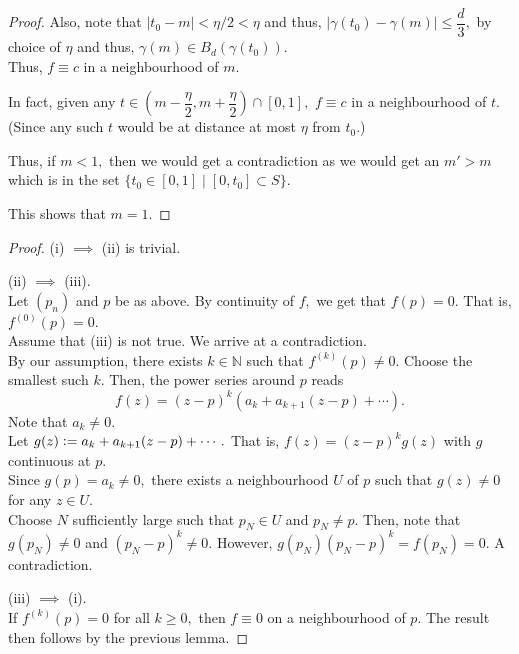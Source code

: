 \begin{proof}
	Also, note that $|t_0 - m| < \eta/2 < \eta$ and thus, $\left|\gamma(t_0) - \gamma(m)\right| \le \dfrac{d}{3},$ by choice of $\eta$ and thus, $\gamma(m) \in B_d(\gamma(t_0)).$\\
	Thus, $f\equiv c$ in a neighbourhood of $m.$

	In fact, given any $t \in \left(m - \dfrac{\eta}{2},  m + \dfrac{\eta}{2}\right) \cap [0, 1],$ $f \equiv c$ in a neighbourhood of $t.$ (Since any such $t$ would be at distance at most $\eta$ from $t_0$.)

	Thus, if $m < 1,$ then we would get a contradiction as we would get an $m' > m$ which is in the set $\{t_0 \in [0, 1] \mid [0, t_0] \subset S\}.$

	This shows that $m = 1.$
\end{proof}


\preiden*\label{thm:preiden2}
\begin{flushright}\hyperref[thm:preiden]{\upsym}\end{flushright}
\begin{proof}
	(i) $\implies$ (ii) is trivial.

	(ii) $\implies$ (iii).\\
	Let $(p_n)$ and $p$ be as above. By continuity of $f,$ we get that $f(p) = 0.$ That is, $f^{(0)}(p) = 0.$\\
	Assume that (iii) is not true. We arrive at a contradiction.\\
	By our assumption, there exists $k \in \mathbb{N}$ such that $f^{(k)}(p) \neq 0.$ Choose the smallest such $k.$ Then, the power series around $p$ reads
	\begin{equation*} 
		f(z) = (z - p)^k(a_k + a_{k+1}(z - p) + \cdots).
	\end{equation*}
	Note that $a_k \neq 0.$\\
	Let $g(z) \vcentcolon= a_k + a_{k+1}(z - p) + \cdots.$ That is, $f(z) = (z - p)^kg(z)$ with $g$ continuous at $p.$\\
	Since $g(p) = a_k \neq 0,$ there exists a neighbourhood $U$ of $p$ such that $g(z) \neq 0$ for any $z \in U.$\\
	Choose $N$ sufficiently large such that $p_N \in U$ and $p_N \neq p.$ Then, note that $g(p_N) \neq 0$ and $(p_N - p)^k \neq 0.$ However, $g(p_N)(p_N - p)^k = f(p_N) = 0.$ A contradiction.

	(iii) $\implies$ (i).\\
	If $f^{(k)}(p) = 0$ for all $k \ge 0,$ then $f \equiv 0$ on a neighbourhood of $p.$ The result then follows by the previous lemma.
\end{proof}


